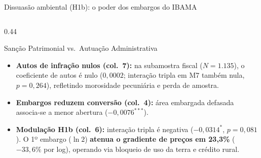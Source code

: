 \documentclass[aspectratio=169,10.5pt]{beamer}
\newcommand{\fonte}[1]{\par\vspace{1mm}{\fontsize{6.5}{7.5}\selectfont\color{gray}Fonte: #1\par}}
\newcommand{\est}[2]{\ensuremath{#1}\;{\color{gray}\fontsize{7}{8}\selectfont(#2)}}
\begin{document}
\begin{frame}{Dissuasão ambiental (H1b): o poder dos embargos do IBAMA}
\begin{columns}[T]
\begin{column}{0.44\textwidth}
\begin{block}{Sanção Patrimonial vs.\ Autuação Administrativa}
\fontsize{7.4}{8.9}\selectfont
\begin{itemize}
    \setlength{\itemsep}{0.75mm}
    \item \textbf{Autos de infração nulos (col.\ 7):} na subamostra fiscal ($N=1.135$), o coeficiente de autos é nulo (\est{0{,}0002}{0{,}0060}; interação tripla em M7 também nula, $p=0{,}264$), refletindo morosidade pecuniária e perda de amostra.
    \item \textbf{Embargos reduzem conversão (col.\ 4):} área embargada defasada associa-se a menor abertura (\est{-0{,}0076^{***}}{0{,}0029}).
    \item \textbf{Modulação H1b (col.\ 6):} interação tripla é negativa ($-0{,}0314^*$, $p=0{,}081$). O 1º embargo ($\ln 2$) \textbf{atenua o gradiente de preços em 23,3\%} ($-33{,}6\%$ por log), operando via bloqueio de uso da terra e crédito rural.
\end{itemize}
\end{block}
\end{column}
\end{columns}
\end{frame}
\end{document}
